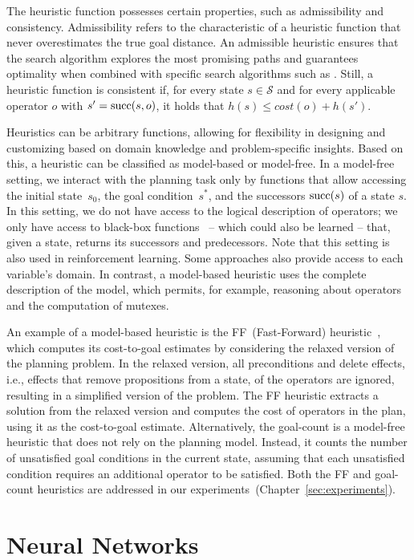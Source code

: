 The heuristic function possesses certain properties, such as admissibility and consistency. Admissibility refers to the characteristic of a heuristic function that never overestimates the true goal distance. An admissible heuristic ensures that the search algorithm explores the most promising paths and guarantees optimality when combined with specific search algorithms such as \astar. Still, a heuristic function is consistent if, for every state $s \in \mathcal{S}$ and for every applicable operator $o$ with $s' = \operatorname{succ}(s,o)$, it holds that $h(s) \leq cost(o) + h(s')$.

Heuristics can be arbitrary functions, allowing for flexibility in designing and customizing based on domain knowledge and problem-specific insights. Based on this, a heuristic can be classified as model-based or model-free. In a model-free setting, we interact with the planning task only by functions that allow accessing the initial state~$s_0$, the goal condition~$s^*$, and the successors $\operatorname{succ}(s)$ of a state $s$. In this setting, we do not have access to the logical description of operators; we only have access to black-box functions~\cite{Sturtevant2019} -- which could also be learned -- that, given a state, returns its successors and predecessors. Note that this setting is also used in reinforcement learning. Some approaches also provide access to each variable's domain. In contrast, a model-based heuristic uses the complete description of the model, which permits, for example, reasoning about operators and the computation of mutexes.

An example of a model-based heuristic is the FF~(Fast-Forward) heuristic~\cite{Hoffmann.Nebel/2001}, which computes its cost-to-goal estimates by considering the relaxed version of the planning problem. In the relaxed version, all preconditions and delete effects, i.e., effects that remove propositions from a state, of the operators are ignored, resulting in a simplified version of the problem. The FF heuristic extracts a solution from the relaxed version and computes the cost of operators in the plan, using it as the cost-to-goal estimate. Alternatively, the goal-count is a model-free heuristic that does not rely on the planning model. Instead, it counts the number of unsatisfied goal conditions in the current state, assuming that each unsatisfied condition requires an additional operator to be satisfied. Both the FF and goal-count heuristics are addressed in our experiments~(Chapter~\ref{sec:experiments}).

\section{Neural Networks}
\label{sec:background_neuralnetworks}

